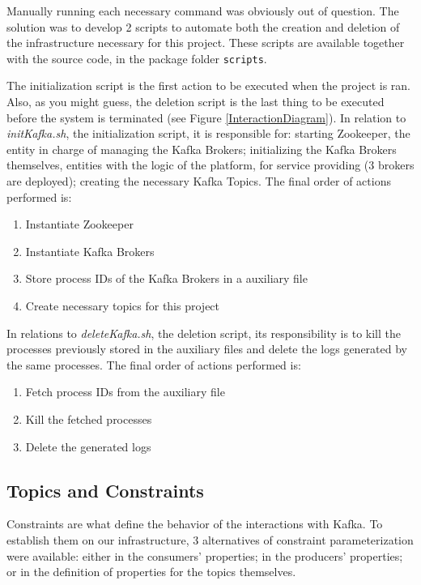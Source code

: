 \documentclass[12pt]{article}
\begin{document}
Manually running each necessary command was obviously out of question.
The solution was to develop 2 scripts to automate both the creation and deletion of the infrastructure necessary for this project. 
These scripts are available together with the source code, in the package folder \texttt{scripts}.

The initialization script is the first action to be executed when the project is ran.
Also, as you might guess, the deletion script is the last thing to be executed before the system is terminated (see Figure \ref{InteractionDiagram}).
In relation to \textit{initKafka.sh}, the initialization script, it is responsible for: starting Zookeeper, the entity in charge of managing the Kafka Brokers;
initializing the Kafka Brokers themselves, entities with the logic of the platform, for service providing (3 brokers are deployed); creating the necessary Kafka Topics.
The final order of actions performed is:
\vspace{-10pt}
\begin{enumerate} [noitemsep]
  \item Instantiate Zookeeper
  \item Instantiate Kafka Brokers
  \item Store process IDs of the Kafka Brokers in a auxiliary file
  \item Create necessary topics for this project
\end{enumerate}
\vspace{-10pt}
In relations to \textit{deleteKafka.sh}, the deletion script, its responsibility is to kill the processes previously stored in the auxiliary files and delete 
the logs generated by the same processes.
The final order of actions performed is:
\vspace{-10pt}
\begin{enumerate} [noitemsep]
  \item Fetch process IDs from the auxiliary file
  \item Kill the fetched processes
  \item Delete the generated logs
\end{enumerate}
\vspace{-10pt}

\subsection{Topics and Constraints} \label{topics} %

Constraints are what define the behavior of the interactions with Kafka.
To establish them on our infrastructure, 3 alternatives of constraint parameterization were available: 
either in the consumers' properties; in the producers' properties; or in the definition of properties for the topics themselves.
\end{document}
